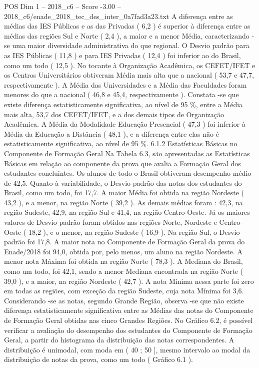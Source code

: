 \begin{textsample}{POS Dim 1 – 2018\_c6 – Score -3.00 – 2018\_c6/enade\_2018\_tec\_des\_inter\_0a7fad3a23.txt}
A diferença entre as médias das IES Públicas e as das Privadas ( 6,2 ) é superior à diferença entre as médias das regiões Sul e Norte ( 2,4 ), a maior e a menor Média, caracterizando -se uma maior diversidade administrativa do que regional.
O Desvio padrão para as IES Públicas ( 11,8 ) e para IES Privadas ( 12,4 ) foi inferior ao do Brasil, como um todo ( 12,5 ).
No tocante à Organização Acadêmica, os CEFET/IFET e os Centros Universitários obtiveram Média mais alta que a nacional ( 53,7 e 47,7, respectivamente ).
A Média das Universidades e a Média das Faculdades foram menores do que a nacional ( 46,8 e 45,4, respectivamente ).
Constata -se que existe diferença estatisticamente significativa, ao nível de 95 \%, entre a Média mais alta, 53,7 dos CEFET/IFET, e a dos demais tipos de Organização Acadêmica.
A Média da Modalidade Educação Presencial ( 47,3 ) foi inferior à Média da Educação a Distância ( 48,1 ), e a diferença entre elas não é estatisticamente significativa, ao nível de 95 \%. 6.1.2 Estatísticas Básicas no Componente de Formação Geral Na Tabela 6.3, são apresentadas as Estatísticas Básicas em relação ao componente da prova que avalia a Formação Geral dos estudantes concluintes.
Os alunos de todo o Brasil obtiveram desempenho médio de 42,5.
Quanto à variabilidade, o Desvio padrão das notas dos estudantes do Brasil, como um todo, foi 17,7.
A maior Média foi obtida na região Nordeste ( 43,2 ), e a menor, na região Norte ( 39,2 ).
As demais médias foram : 42,3, na região Sudeste, 42,9, na região Sul e 41,4, na região Centro-Oeste.
Já os maiores valores de Desvio padrão foram obtidos nas regiões Norte, Nordeste e Centro-Oeste ( 18,2 ), e o menor, na região Sudeste ( 16,9 ).
Na região Sul, o Desvio padrão foi 17,8.
A maior nota no Componente de Formação Geral da prova do Enade/2018 foi 94,0, obtida por, pelo menos, um aluno na região Nordeste.
A menor nota Máxima foi obtida na região Norte ( 78,3 ).
A Mediana do Brasil, como um todo, foi 42,1, sendo a menor Mediana encontrada na região Norte ( 39,0 ), e a maior, na região Nordeste ( 42,7 ).
A nota Mínima nessa parte foi zero em todas as regiões, com exceção da região Sudeste, cuja nota Mínima foi 3,6.
Considerando -se as notas, segundo Grande Região, observa -se que não existe diferença estatisticamente significativa entre as Médias das notas do Componente de Formação Geral obtidas nas cinco Grandes Regiões.
No Gráfico 6.2, é possível verificar a avaliação do desempenho dos estudantes do Componente de Formação Geral, a partir do histograma da distribuição das notas correspondentes.
A distribuição é unimodal, com moda em ( 40 ; 50 ], mesmo intervalo ao modal da distribuição de notas da prova, como um todo ( Gráfico 6.1 ).

\end{textsample}
